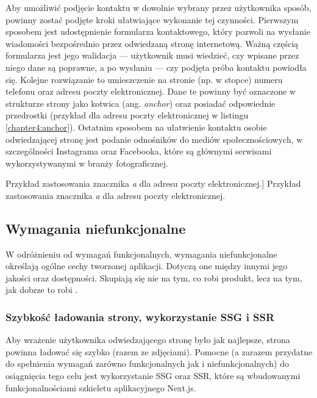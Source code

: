 \documentclass[12pt]{article}
\numberwithin{figure}{section}
\begin{document}
\begin{sloppypar}
Aby umożliwić podjęcie kontaktu w dowolnie wybrany przez użytkownika sposób, powinny zostać podjęte kroki ułatwiające wykonanie tej czynności. Pierwszym sposobem jest udostępnienie formularza kontaktowego, który pozwoli na wysłanie wiadomości bezpośrednio przez odwiedzaną stronę internetową. Ważną częścią formularza jest jego walidacja --- użytkownik musi wiedzieć, czy wpisane przez niego dane są poprawne, a po wysłaniu --- czy podjęta próba kontaktu powiodła się. Kolejne rozwiązanie to umieszczenie na stronie (np. w stopce) numeru telefonu oraz adresu poczty elektronicznej. Dane te powinny być oznaczone w strukturze strony jako kotwica (ang. \textit{anchor}) oraz posiadać odpowiednie przedrostki (przykład dla adresu poczty elektronicznej w listingu \ref{chapter4:anchor}). Ostatnim sposobem na ułatwienie kontaktu osobie odwiedzającej stronę jest podanie odnośników do mediów społecznościowych, w szczególności Instagrama oraz Facebooka, które są głównymi serwisami wykorzystywanymi w branży fotograficznej. \newline\newline

\begin{code}[htbp]
    
    \caption
    [Przykład zastosowania znacznika \textit{a} dla adresu poczty elektronicznej.]
    {Przykład zastosowania znacznika \textit{a} dla adresu poczty elektronicznej.}
    \label{chapter4:anchor}
\end{code}


\subsection{Wymagania niefunkcjonalne}

W odróżnieniu od wymagań funkcjonalnych, wymagania niefunkcjonalne określają ogólne cechy tworzonej aplikacji. Dotyczą one między innymi jego jakości oraz dostępności. Skupiają się nie na tym, co robi produkt, lecz na tym, jak dobrze to robi \cite{wymagania}.

\subsubsection*{Szybkość ładowania strony, wykorzystanie SSG i SSR}

Aby wrażenie użytkownika odwiedzającego stronę było jak najlepsze, strona powinna ładować się szybko (razem ze zdjęciami). Pomocne (a zarazem przydatne do spełnienia wymagań zarówno funkcjonalnych jak i niefunkcjonalnych) do osiągnięcia tego celu jest wykorzystanie SSG oraz SSR, które są wbudowanymi funkcjonalnościami szkieletu aplikacyjnego Next.js. 


\end{sloppypar}
\end{document}
